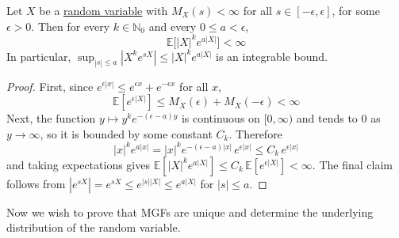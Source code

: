 	\begin{lemma}
	  \label{thm:domination-lemma}
		Let $X$ be a \hyperref[def:random-variable]{random variable} with $M_X (s) < \infty$ for all $s \in [-\epsilon, \epsilon]$, for some $\epsilon > 0$. Then for every $k \in \mathbb{N}_0$ and every $0 \leq a < \epsilon$, 
		\begin{equation}
			\mathbb{E}\big[ |X|^k e^{a |X|} \big] < \infty
		\end{equation}
		In particular, $\sup_{|s| \leq a} |X^k e^{s X}| \leq |X|^k e^{a |X|}$ is an integrable bound. 
	\end{lemma}
	\begin{proof}
		First, since $e^{\epsilon |x|} \leq e^{\epsilon x} + e^{-\epsilon x}$ for all $x$, 
		\begin{equation}
			\mathbb{E}[e^{\epsilon |X|}] \leq M_X (\epsilon) + M_X (-\epsilon) < \infty
		\end{equation}
		Next, the function $y \mapsto y^k e^{-(\epsilon - a) y}$ is continuous on $[0, \infty)$ and tends to $0$ as $y \to \infty$, so it is bounded by some constant $C_{k}$. Therefore 
		\begin{equation}
			|x|^k e^{a |x|} = |x|^k e^{-(\epsilon - a)|x|} \, e^{\epsilon |x|} \leq C_{k} \, e^{\epsilon |x|}
		\end{equation}
		and taking expectations gives $\mathbb{E}[|X|^k e^{a|X|}] \leq C_{k} \, \mathbb{E}[e^{\epsilon |X|}] < \infty$. The final claim follows from $|e^{s X}| = e^{s X} \leq e^{|s| |X|} \leq e^{a |X|}$ for $|s| \leq a$. 
	\end{proof}

	Now we wish to prove that MGFs are unique and determine the underlying distribution of the random variable. 

